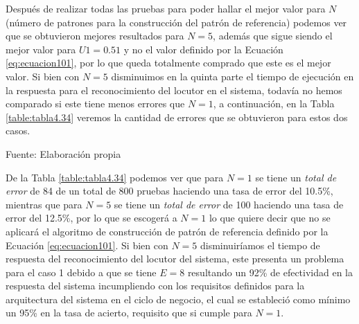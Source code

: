 Después de realizar todas las pruebas para poder hallar el mejor valor para $N$ (número de patrones para la construcción del patrón de referencia) podemos ver que se obtuvieron mejores resultados para $N = 5$, además que sigue siendo el mejor valor para $U1 = 0.51$ y no el valor definido por la Ecuación \eqref{eq:ecuacion101}, por lo que queda totalmente comprado que este es el mejor valor. 
\vskip 0.5cm
Si bien con $N = 5$ disminuimos en la quinta parte el tiempo de ejecución en la respuesta para el reconocimiento del locutor en el sistema, todavía no hemos comparado si este tiene menos errores que $N = 1$, a continuación, en la Tabla \ref{table:tabla4.34} veremos la cantidad de errores que se obtuvieron para estos dos casos.

\begin{center}
\begin{table}[H]
\centering
\caption{\small{Comparación de numero de errores entre U1 = U y U1 = 0.51.}}
\label{table:tabla4.34}
\vskip 0.2cm
\begin{center}
\vskip 0.2cm
{\small{Fuente: Elaboración propia}}
\end{center}
\end{table}
\end{center}

De la Tabla \ref{table:tabla4.34} podemos ver que para $N = 1$ se tiene un \textit{total de error} de 84 de un total de 800 pruebas haciendo una tasa de error del 10.5\%, mientras que para $N = 5$ se tiene un \textit{total de error} de 100 haciendo una tasa de error del 12.5\%, por lo que se escogerá a $N = 1$ lo que quiere decir que no se aplicará el algoritmo de construcción de patrón de referencia definido por la Ecuación \eqref{eq:ecuacion101}. 
\vskip 0.5cm
Si bien con $N = 5$ disminuiríamos el tiempo de respuesta del reconocimiento del locutor del sistema, este presenta un problema para el caso 1 debido a que se tiene $E = 8$ resultando un 92\% de efectividad en la respuesta del sistema incumpliendo con los requisitos definidos para la arquitectura del sistema en el ciclo de negocio, el cual se estableció como mínimo un 95\% en la tasa de acierto, requisito que si cumple para $N = 1$.

